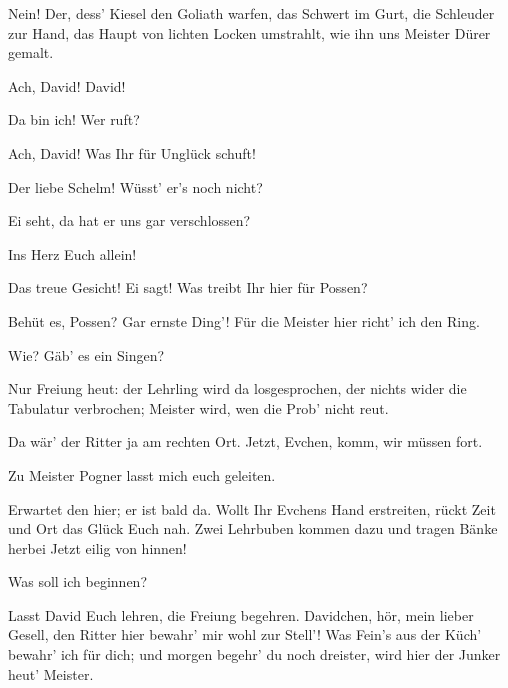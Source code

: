 \begin{drama}
\Evaspeaks
Nein! Der, dess' Kiesel den Goliath warfen,
das Schwert im Gurt, die Schleuder zur Hand,
das Haupt von lichten Locken umstrahlt,
wie ihn uns Meister Dürer gemalt.

\Magdalenespeaks
{}

Ach, David! David!

\Davidspeaks
{}

Da bin ich! Wer ruft?

\Magdalenespeaks

Ach, David! Was Ihr für Unglück schuft!


Der liebe Schelm! Wüsst' er's noch nicht?


Ei seht, da hat er uns gar verschlossen?

\Davidspeaks


Ins Herz Euch allein!

\Magdalenespeaks
{}

Das treue Gesicht! Ei sagt!
Was treibt Ihr hier für Possen?

\Davidspeaks
Behüt es, Possen? Gar ernste Ding'!
Für die Meister hier richt' ich den Ring.

\Magdalenespeaks
Wie? Gäb' es ein Singen?

\Davidspeaks

Nur Freiung heut:
der Lehrling wird da losgesprochen,
der nichts wider die Tabulatur verbrochen;
Meister wird, wen die Prob' nicht reut.

\Magdalenespeaks
Da wär' der Ritter ja am rechten Ort.
Jetzt, Evchen, komm, wir müssen fort.

\Waltherspeaks
{}

Zu Meister Pogner lasst mich euch geleiten.

\Magdalenespeaks
Erwartet den hier; er ist bald da.
Wollt Ihr Evchens Hand erstreiten,
rückt Zeit und Ort das Glück Euch nah.
Zwei Lehrbuben kommen dazu und tragen Bänke herbei
Jetzt eilig von hinnen!

\Waltherspeaks
Was soll ich beginnen?

\Magdalenespeaks
Lasst David Euch lehren, die Freiung begehren.
Davidchen, hör, mein lieber Gesell,
den Ritter hier bewahr' mir wohl zur Stell'!
Was Fein's aus der Küch' bewahr' ich für dich;
und morgen begehr' du noch dreister,
wird hier der Junker heut' Meister.


\end{drama}
